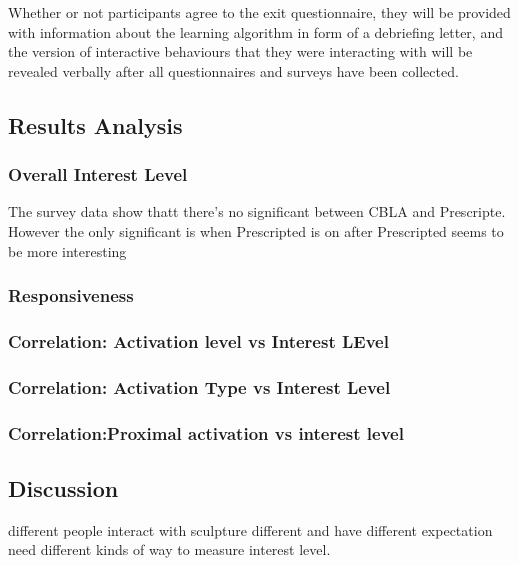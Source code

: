 Whether or not participants agree to the exit questionnaire, they will be provided with
information about the learning algorithm in form of a debriefing letter, and the version of
interactive behaviours that they were interacting with will be revealed verbally after all
questionnaires and surveys have been collected.

\subsection{Results Analysis}

\subsubsection{Overall Interest Level}
The survey data show thatt there's no significant between CBLA and Prescripte.
However the only significant is when Prescripted is on after Prescripted seems to be more interesting
 
\subsubsection{Responsiveness}

\subsubsection{Correlation: Activation level vs Interest LEvel}

\subsubsection{Correlation: Activation Type vs Interest Level}
\subsubsection{Correlation:Proximal activation vs interest level}



\subsection{Discussion}

different people interact with sculpture different and have different expectation
need different kinds of way to measure interest level. 



